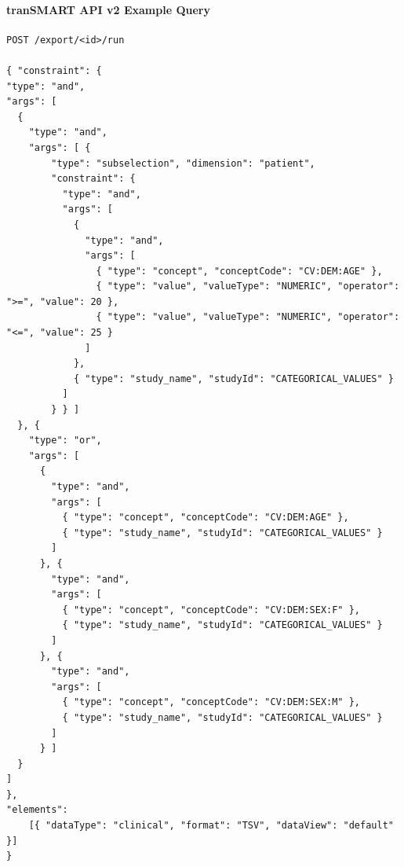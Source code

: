 \paragraph{tranSMART API v2 Example Query}
\begin{verbatim}
POST /export/<id>/run

{ "constraint": {
"type": "and",
"args": [
  {
    "type": "and",
    "args": [ {
        "type": "subselection", "dimension": "patient",
        "constraint": {
          "type": "and",
          "args": [
            {
              "type": "and",
              "args": [
                { "type": "concept", "conceptCode": "CV:DEM:AGE" },
                { "type": "value", "valueType": "NUMERIC", "operator": ">=", "value": 20 },
                { "type": "value", "valueType": "NUMERIC", "operator": "<=", "value": 25 }
              ]
            },
            { "type": "study_name", "studyId": "CATEGORICAL_VALUES" }
          ]
        } } ]
  }, {
    "type": "or",
    "args": [
      {
        "type": "and",
        "args": [
          { "type": "concept", "conceptCode": "CV:DEM:AGE" },
          { "type": "study_name", "studyId": "CATEGORICAL_VALUES" }
        ]
      }, {
        "type": "and",
        "args": [
          { "type": "concept", "conceptCode": "CV:DEM:SEX:F" },
          { "type": "study_name", "studyId": "CATEGORICAL_VALUES" }
        ]
      }, {
        "type": "and",
        "args": [
          { "type": "concept", "conceptCode": "CV:DEM:SEX:M" },
          { "type": "study_name", "studyId": "CATEGORICAL_VALUES" }
        ]
      } ]
  }
]
},
"elements": 
    [{ "dataType": "clinical", "format": "TSV", "dataView": "default" }]
}
\end{verbatim}

